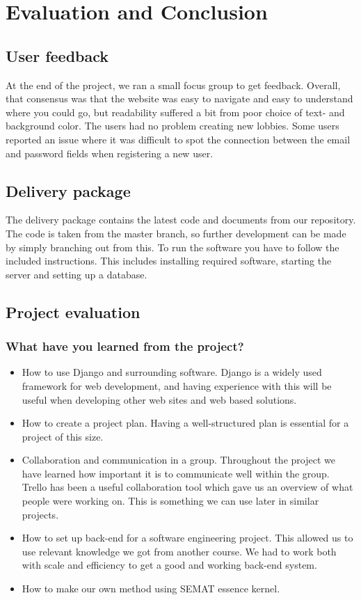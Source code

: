 \section {Evaluation and Conclusion}
\subsection{User feedback}
At the end of the project, we ran a small focus group to get feedback. Overall, that consensus was that the website was easy to navigate and easy to understand where you could go, but readability suffered a bit from poor choice of text- and background color. The users had no problem creating new lobbies. Some users reported an issue where it was difficult to spot the connection between the email and password fields when registering a new user.

\subsection{Delivery package}
The delivery package contains the latest code and documents from our repository. The code is taken from the master branch, so further development can be made by simply branching out from this. To run the software you have to follow the included instructions. This includes installing required software, starting the server and setting up a database.  

\subsection{Project evaluation}

\subsubsection{What have you learned from the project?}
\begin{itemize}
    \item How to use Django and surrounding software. Django is a widely used framework for web development, and having experience with this will be useful when developing other web sites and web based solutions.
    \item How to create a project plan. Having a well-structured plan is essential for a project of this size.   
    \item Collaboration and communication in a group. Throughout the project we have learned how important it is to communicate well within the group. Trello has been a useful collaboration tool which gave us an overview of what people were working on. This is something we can use later in similar projects.
    \item How to set up back-end for a software engineering project. This allowed us to use relevant knowledge we got from another course. We had to work both with scale and efficiency to get a good and working back-end system.
    \item How to make our own method using SEMAT essence kernel.
\end{itemize}

